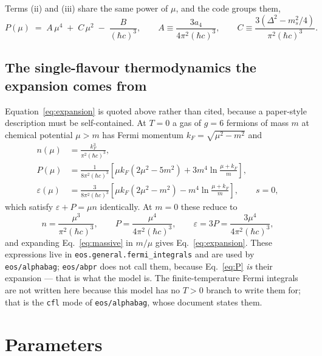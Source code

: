 \documentclass[aps,prc,onecolumn,superscriptaddress,nofootinbib,10pt]{revtex4-2}
\newcommand{\hc}{(\hbar c)^3}
\newcommand{\ms}{m_s}
\begin{document}
Terms (ii) and (iii) share the same power of $\mu$, and the code groups them,
%
\begin{equation}
P(\mu) \;=\; A\,\mu^4 \;+\; C\,\mu^2 \;-\; \frac{B}{\hc} ,
\qquad
A \equiv \frac{3 a_4}{4\pi^2\hc} ,
\qquad
C \equiv \frac{3\left(\Delta^2 - \ms^2/4\right)}{\pi^2\hc} .
\label{eq:PAC}
\end{equation}

\subsection{The single-flavour thermodynamics the expansion comes from}

Equation~\eqref{eq:expansion} is quoted above rather than cited, because a
paper-style description must be self-contained. At $T = 0$ a gas of $g = 6$
fermions of mass $m$ at chemical potential $\mu > m$ has Fermi momentum
$k_F = \sqrt{\mu^2 - m^2}$ and
%
\begin{align}
n(\mu) &= \frac{k_F^3}{\pi^2 \hc} ,
\label{eq:massive} \\
P(\mu) &= \frac{1}{8\pi^2 \hc}
          \left[ \mu k_F \left(2\mu^2 - 5 m^2\right)
                 + 3 m^4 \ln\frac{\mu + k_F}{m} \right] ,
\nonumber \\
\varepsilon(\mu) &= \frac{3}{8\pi^2 \hc}
          \left[ \mu k_F \left(2\mu^2 - m^2\right)
                 - m^4 \ln\frac{\mu + k_F}{m} \right] ,
\qquad s = 0 ,
\nonumber
\end{align}
%
which satisfy $\varepsilon + P = \mu n$ identically. At $m = 0$ these reduce
to
%
\begin{equation}
n = \frac{\mu^3}{\pi^2\hc} , \qquad
P = \frac{\mu^4}{4\pi^2\hc} , \qquad
\varepsilon = 3P = \frac{3\mu^4}{4\pi^2\hc} ,
\label{eq:massless}
\end{equation}
%
and expanding Eq.~\eqref{eq:massive} in $m/\mu$ gives
Eq.~\eqref{eq:expansion}. These expressions live in
\texttt{eos.general.fermi\_integrals} and are used by \texttt{eos/alphabag};
\texttt{eos/abpr} does not call them, because Eq.~\eqref{eq:P} \emph{is} their
expansion --- that is what the model is. The finite-temperature Fermi integrals
are not written here because this model has no $T > 0$ branch to write them
for; that is the \texttt{cfl} mode of \texttt{eos/alphabag}, whose document
states them.

\section{Parameters}
\label{sec:parameters}
\end{document}
